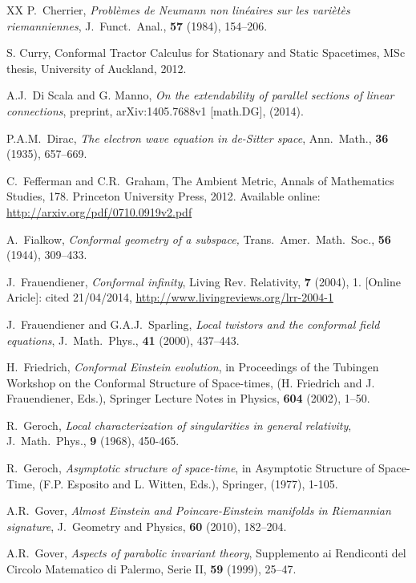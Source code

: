 \documentclass[a4paper,12pt]{amsart}
\theoremstyle{remark}
\begin{document}
\begin{thebibliography}{XX}
 P.\ Cherrier, {\em Probl\`emes de Neumann non
  lin\'eaires sur les vari\`et\`es riemanniennes},
  J.\ Funct.\ Anal., {\bf 57} (1984), 154--206.

 S. Curry, Conformal Tractor Calculus for Stationary and
		Static Spacetimes, MSc thesis, University of Auckland, 2012.

 A.J.\ Di Scala and G. Manno, {\em On the
  extendability of parallel sections of linear connections}, preprint,
  arXiv:1405.7688v1 [math.DG], (2014).

 P.A.M.\ Dirac, {\em The electron wave equation in de-Sitter
		space}, Ann.\ Math., {\bf 36} (1935), 657--669.

 C.\ Fefferman and C.R.\ Graham, The Ambient Metric, Annals of 
		Mathematics Studies, 178. Princeton University Press, 2012. 
		Available online: \url{http://arxiv.org/pdf/0710.0919v2.pdf}

 A.\ Fialkow, {\em Conformal geometry of a subspace,}
  Trans.\ Amer.\ Math.\ Soc., {\bf 56} (1944), 309--433.

 J.\ Frauendiener, {\em Conformal infinity},
  Living Rev. Relativity, {\bf 7} (2004), 1. {[}Online Aricle{]}: cited
  21/04/2014, \url{http://www.livingreviews.org/lrr-2004-1}
	
 J.\ Frauendiener and G.A.J.\ Sparling, {\em Local
  twistors and the conformal field equations}, J.\ Math.\ Phys., {\bf
  41} (2000), 437--443.

 H.\ Friedrich, {\em Conformal
  Einstein evolution}, in Proceedings of the Tubingen Workshop on the
  Conformal Structure of Space-times, (H. Friedrich and
  J. Frauendiener, Eds.), Springer Lecture Notes in Physics, {\bf 604}
  (2002), 1--50.
		
 R.\ Geroch, {\em Local characterization of
  singularities in general relativity}, J.\ Math.\ Phys., {\bf 9} (1968),
  450-465.

 R.\ Geroch, {\em Asymptotic structure of space-time}, in Asymptotic Structure of Space-Time, (F.P. Esposito and L. Witten, Eds.), Springer, (1977), 1-105.

 A.R.\ Gover, {\em Almost Einstein and
		Poincare-Einstein manifolds in Riemannian signature}, J.\
		Geometry and Physics, {\bf 60} (2010), 182--204.

 A.R.\ Gover, {\em Aspects of parabolic invariant
  theory}, Supplemento ai Rendiconti del Circolo Matematico di
  Palermo, Serie II, {\bf 59} (1999), 25--47.


\end{thebibliography}
\end{document}
